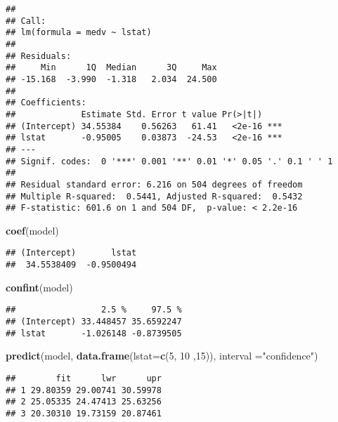 \documentclass[
]{article}
\newenvironment{Shaded}{\begin{snugshade}}{\end{snugshade}}
\newcommand{\AttributeTok}[1]{\textcolor[rgb]{0.13,0.29,0.53}{#1}}
\newcommand{\DecValTok}[1]{\textcolor[rgb]{0.00,0.00,0.81}{#1}}
\newcommand{\FunctionTok}[1]{\textcolor[rgb]{0.13,0.29,0.53}{\textbf{#1}}}
\newcommand{\NormalTok}[1]{#1}
\newcommand{\StringTok}[1]{\textcolor[rgb]{0.31,0.60,0.02}{#1}}
\begin{document}
\begin{verbatim}
## 
## Call:
## lm(formula = medv ~ lstat)
## 
## Residuals:
##     Min      1Q  Median      3Q     Max 
## -15.168  -3.990  -1.318   2.034  24.500 
## 
## Coefficients:
##             Estimate Std. Error t value Pr(>|t|)    
## (Intercept) 34.55384    0.56263   61.41   <2e-16 ***
## lstat       -0.95005    0.03873  -24.53   <2e-16 ***
## ---
## Signif. codes:  0 '***' 0.001 '**' 0.01 '*' 0.05 '.' 0.1 ' ' 1
## 
## Residual standard error: 6.216 on 504 degrees of freedom
## Multiple R-squared:  0.5441, Adjusted R-squared:  0.5432 
## F-statistic: 601.6 on 1 and 504 DF,  p-value: < 2.2e-16
\end{verbatim}

\begin{Shaded}
\begin{Highlighting}[]
\FunctionTok{coef}\NormalTok{(model)}
\end{Highlighting}
\end{Shaded}

\begin{verbatim}
## (Intercept)       lstat 
##  34.5538409  -0.9500494
\end{verbatim}

\begin{Shaded}
\begin{Highlighting}[]
\FunctionTok{confint}\NormalTok{(model)}
\end{Highlighting}
\end{Shaded}

\begin{verbatim}
##                 2.5 %     97.5 %
## (Intercept) 33.448457 35.6592247
## lstat       -1.026148 -0.8739505
\end{verbatim}

\begin{Shaded}
\begin{Highlighting}[]
\FunctionTok{predict}\NormalTok{(model, }\FunctionTok{data.frame}\NormalTok{(}\AttributeTok{lstat=}\FunctionTok{c}\NormalTok{(}\DecValTok{5}\NormalTok{, }\DecValTok{10}\NormalTok{ ,}\DecValTok{15}\NormalTok{)),}
        \AttributeTok{interval =}\StringTok{"confidence"}\NormalTok{)}
\end{Highlighting}
\end{Shaded}

\begin{verbatim}
##        fit      lwr      upr
## 1 29.80359 29.00741 30.59978
## 2 25.05335 24.47413 25.63256
## 3 20.30310 19.73159 20.87461
\end{verbatim}
\end{document}
